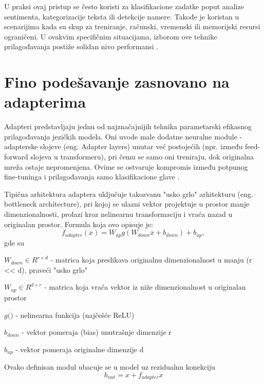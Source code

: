 \documentclass[12pt,oneside]{memoir}
\begin{document}
U praksi ovaj pristup se često koristi za klasifikacione zadatke poput analize sentimenta, kategorizacije teksta ili detekcije namere. Takođe je koristan u scenarijima kada su skup za treniranje, računski, vremenski ili memorijski resursi ograničeni. U ovakvim specifičnim situacijama, izborom ove tehnike prilagođavanja postiže solidan nivo performansi \cite{zaken2022bitfitspeft}. 

\section {Fino podešavanje zasnovano na adapterima}
Adapteri predstavljaju jednu od najznačajnijih tehnika parametarski efikasnog prilagođavanja jezičkih modela. Oni uvode male dodatne neuralne module - adapterske slojeve (eng. Adapter layers) unutar već postojećih (npr. između feed-forward slojeva u transformeru), pri čemu se samo oni treniraju, dok originalna mreža ostaje nepromenjena. Ovime se ostvaruje kompromis između potpunog fine-tuninga i prilagođavanja samo klasifikacione glave \cite{AdaptersTechnique}.

Tipična arhitektura adaptera uključuje takozvanu "usko grlo" arhitekturu (eng. bottleneck architecture), pri kojoj se ulazni vektor projektuje u prostor manje dimenzionalnosti, prolazi kroz nelinearnu transformaciju i vraća nazad u originalan prostor. Formula koja ovo opisuje je:
\begin{equation}
	f_{adapter}(x) = W_{up}g(W_{down}x + b_{down}) + b_{up},
\end{equation}
gde su
\begin{description}
	\item \(W_{down} \in R^{r \times d}\) - matrica koja preslikava originalnu dimenzionalnost u manju (r << d), praveći "usko grlo"
	\item \(W_{up} \in R^{d \times r}\) - matrica koja vraća vektor iz niže dimenzionalnost u originalan prostor
	\item \(g(\dot)\) - nelinearna funkcija (najčešće ReLU) 
	\item \(b_{down}\) - vektor pomeraja (bias) unutrašnje dimenzije r
	\item \(b_{up}\) - vektor pomeraja originalne dimenzije d 
\end{description} 

Ovako definisan modul ubacuje se u model uz rezidualnu konekciju
\begin{equation}
	h_{out} = x + f_{adapter}x
\end{equation}
\end{document}
